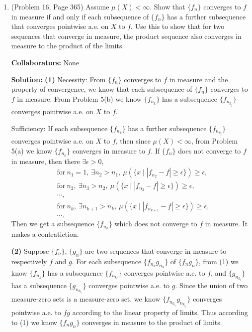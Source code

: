 \documentclass{article}%
\begin{document}
\begin{enumerate}
\item (Problem 16, Page 365) Assume $\mu (X) < \infty$.  Show that $\{f_n\}$ converges to $f$ in measure if and only if each  subsequence of $\{f_n\}$ has a further subsequence that converges pointwise a.e. on $X$ to $f$.  Use this to show that for two sequences that converge in measure, the product sequence also converges in measure to the product of the limits. 

\bigskip
\textbf{Collaborators:} None
\smallskip
 
\textbf{Solution:}
\textbf{(1)} Necessity: From $\{f_n\}$ converges to $f$ in measure and the property of convergence, we know that each subsequence of $\{f_n\}$ converges to $f$ in measure. From Problem 5(b) we know $\{f_{n_k}\}$ has a subsequence $\{f_{n_{k_{j}}}\}$ converges pointwise a.e. on $X$ to $f$.

Sufficiency: If each subsequence $\{f_{n_k}\}$ has a further subsequence $\{f_{n_{k_j}}\}$ converges pointwise a.e. on $X$ to $f$, then since $\mu(X) < \infty$, from Problem 5(a) we know $\{f_{n_k}\}$ converges in measure to $f$. If $\{f_n\}$ does not converge to $f$ in measure, then there $\exists \epsilon > 0$,
$$
\begin{aligned}
&\text{for}~ n_1 = 1, ~\exists n_2 > n_1, ~\mu(\{x\mid |f_{n_2}-f| \ge \epsilon\}) \ge \epsilon, \\
&\text{for}~ n_2, ~\exists n_3 > n_2, ~\mu(\{x\mid |f_{n_3}-f| \ge \epsilon\}) \ge \epsilon, \\
&\cdots, \\
&\text{for}~ n_k, ~\exists n_{k+1} > n_k, ~\mu(\{x\mid |f_{n_{k+1}}-f| \ge \epsilon\}) \ge \epsilon, \\
&\cdots.
\end{aligned}
$$
Then we get a subsequence $\{f_{n_k}\}$ which does not converge to $f$ in measure. It makes a contratiction.

\textbf{(2)} Suppose $\{f_n\}$, $\{g_n\}$ are two sequences that converge in measure to respectively $f$ and $g$. For each subsequence $\{f_{n_k}g_{n_k}\}$ of $\{f_ng_n\}$, from (1) we know $\{f_{n_k}\}$ has a subsequence $\{f_{n_{k_l}}\}$ converges pointwise a.e. to $f$, and $\{g_{n_{k_l}}\}$ has a subsequence $\{g_{n_{k_{l_j}}}\}$ converges pointwise a.e. to $g$. Since the union of two measure-zero sets is a measure-zero set, we know $\{f_{n_{k_{l_j}}}g_{n_{k_{l_j}}}\}$ converges pointwise a.e. to $fg$ according to the linear property of limits. Thus according to (1) we know $\{f_ng_n\}$ converges in measure to the product of limits.
\bigskip


\end{enumerate}
\end{document}
